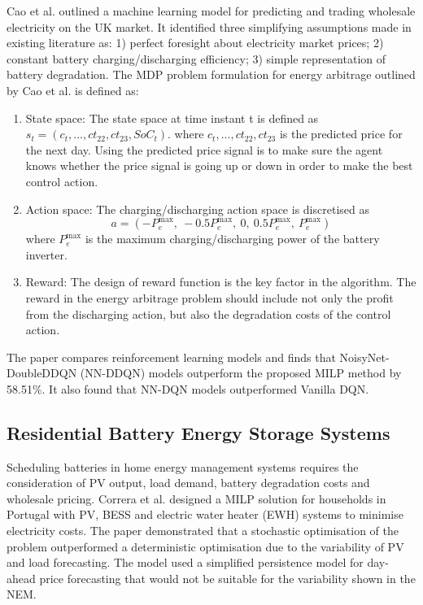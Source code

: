 Cao et al. \cite{Cao2020} outlined a machine learning model for predicting and trading wholesale electricity on the UK market. It identified three simplifying assumptions made in existing literature as: 1) perfect foresight about electricity market prices; 2) constant battery charging/discharging efficiency; 3) simple representation of battery degradation. 
The MDP problem formulation for energy arbitrage outlined by Cao et al. is defined as:
\begin{enumerate}
    \item State space: The state space at time instant t is defined as
$s_t = (c_t, . . . , ct_{22}, ct_{23}, SoC_t)$. where $c_t, . . . , ct_{22}, ct_{23}$ is
the predicted price for the next day. Using the predicted price
signal is to make sure the agent knows whether the price signal
is going up or down in order to make the best control action.
    \item Action space: The charging/discharging action space is discretised as 
        \begin{equation}
            a = \left( -P^{\max}_{e},\ -0.5P^{\max}_{e},\ 0,\ 0.5P^{\max}_{e},\ P^{\max}_{e} \right)
            \label{eq:actionspace}
        \end{equation}
    where $P^{\max}_{e}$ is the maximum charging/discharging power of the battery inverter.
    \item Reward: The design of reward function is the key factor in the algorithm. The reward in the energy arbitrage problem should include not only the profit from the discharging action, but also the degradation costs of the control action.
\end{enumerate}


The paper compares reinforcement learning models and finds that NoisyNet-DoubleDDQN (NN-DDQN) models outperform the proposed MILP method by 58.51\%. It also found that NN-DQN models outperformed Vanilla DQN.

\subsection{Residential Battery Energy Storage Systems}
\label{sec:bg2.2}
Scheduling batteries in home energy management systems requires the consideration of PV output, load demand, battery degradation costs and wholesale pricing. Correra et al. \cite{correa2018stochastic} designed a MILP solution for households in Portugal with PV, BESS and electric water heater (EWH) systems to minimise electricity costs. The paper demonstrated that a stochastic optimisation of the problem outperformed a deterministic optimisation due to the variability of PV and load forecasting. The model used a simplified persistence model for day-ahead price forecasting that would not be suitable for the variability shown in the NEM. \par

